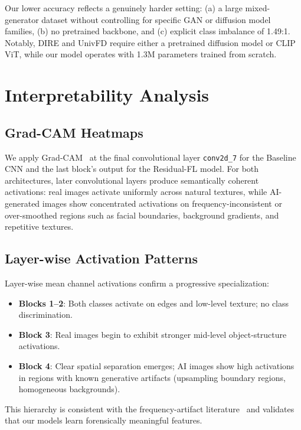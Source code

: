 \documentclass[10pt,twocolumn]{article}
\begin{document}
Our lower accuracy reflects a genuinely harder setting: (a) a large mixed-generator
dataset without controlling for specific GAN or diffusion model families,
(b) no pretrained backbone, and (c) explicit class imbalance of 1.49:1.
Notably, DIRE and UnivFD require either a pretrained diffusion model or CLIP ViT,
while our model operates with 1.3M parameters trained from scratch.

\section{Interpretability Analysis}
\label{sec:interpret}

\subsection{Grad-CAM Heatmaps}

We apply Grad-CAM~\cite{selvaraju2017gradcam} at the final convolutional layer
\texttt{conv2d\_7} for the Baseline CNN and the last block's output for the
Residual-FL model. For both architectures, later convolutional layers produce
semantically coherent activations: real images activate uniformly across
natural textures, while AI-generated images show concentrated activations on
frequency-inconsistent or over-smoothed regions such as facial boundaries,
background gradients, and repetitive textures.

\subsection{Layer-wise Activation Patterns}

Layer-wise mean channel activations confirm a progressive specialization:
\begin{itemize}[leftmargin=1.2em, itemsep=1pt]
  \item \textbf{Blocks 1--2}: Both classes activate on edges and low-level
  texture; no class discrimination.
  \item \textbf{Block 3}: Real images begin to exhibit stronger mid-level
  object-structure activations.
  \item \textbf{Block 4}: Clear spatial separation emerges; AI images show
  high activations in regions with known generative artifacts (upsampling
  boundary regions, homogeneous backgrounds).
\end{itemize}

This hierarchy is consistent with the frequency-artifact literature~\cite{frank2020frequency}
and validates that our models learn forensically meaningful features.
\end{document}
